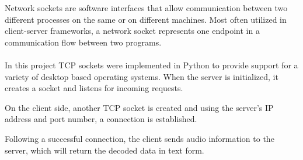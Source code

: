 Network sockets are software interfaces that allow communication between two different processes on the same or on different machines.
Most often utilized in client-server frameworks, a network socket represents one endpoint in a communication flow between two programs.\\\\
In this project TCP sockets were implemented in Python to provide support for a variety of desktop based operating systems.
When the server is initialized, it creates a socket and listens for incoming requests.

On the client side, another TCP socket is created and using the server's IP address and port number, a connection is established. 

Following a successful connection, the client sends audio information to the server, which will return the decoded data in text form. 